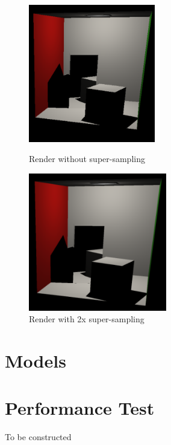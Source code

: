 \documentclass{article}
\begin{document}
    \begin{figure}[!htb]
          \includegraphics[width=\linewidth , height=6cm]{images/supersampling_non_supersampled.png}
          \caption*{Render without super-sampling}
        \endminipage\hfill
          \includegraphics[width=\linewidth , height=6cm]{images/supersampling_supersampled.png}
          \caption*{Render with 2x super-sampling}
        \endminipage
    \end{figure}

    \section{Models}

    \section{Performance Test}
    To be constructed
\end{document}
